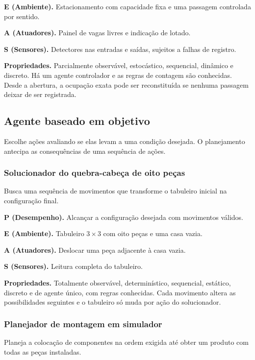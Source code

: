 \documentclass[12pt,a4paper]{article}
\begin{document}
\textbf{E (Ambiente).} Estacionamento com capacidade fixa e uma passagem controlada por sentido.

\textbf{A (Atuadores).} Painel de vagas livres e indicação de lotado.

\textbf{S (Sensores).} Detectores nas entradas e saídas, sujeitos a falhas de registro.

\textbf{Propriedades.} Parcialmente observável, estocástico, sequencial, dinâmico e discreto. Há um agente controlador e as regras de contagem são conhecidas. Desde a abertura, a ocupação exata pode ser reconstituída se nenhuma passagem deixar de ser registrada.

\subsection{Agente baseado em objetivo}

Escolhe ações avaliando se elas levam a uma condição desejada. O planejamento antecipa as consequências de uma sequência de ações.

\subsubsection{Solucionador do quebra-cabeça de oito peças}

Busca uma sequência de movimentos que transforme o tabuleiro inicial na configuração final.

\textbf{P (Desempenho).} Alcançar a configuração desejada com movimentos válidos.

\textbf{E (Ambiente).} Tabuleiro $3 \times 3$ com oito peças e uma casa vazia.

\textbf{A (Atuadores).} Deslocar uma peça adjacente à casa vazia.

\textbf{S (Sensores).} Leitura completa do tabuleiro.

\textbf{Propriedades.} Totalmente observável, determinístico, sequencial, estático, discreto e de agente único, com regras conhecidas. Cada movimento altera as possibilidades seguintes e o tabuleiro só muda por ação do solucionador.

\subsubsection{Planejador de montagem em simulador}

Planeja a colocação de componentes na ordem exigida até obter um produto com todas as peças instaladas.
\end{document}
